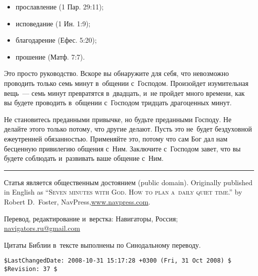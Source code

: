 \documentclass[12pt,article,a4paper,fittopage]{ncc}
\begin{document}
\begin{multicols}{2}
\begin{itemize}
\item прославление (1 Пар. 29:11);
\item исповедание (1 Ин. 1:9); 
\item благодарение (Ефес. 5:20);
\item прошение (Матф. 7:7).
\end{itemize}

Это просто руководство. Вскоре вы обнаружите для себя, что невозможно проводить только семь минут в~общении с~Господом. Произойдет изумительная вещь~--- семь минут превратятся в~двадцать, и~не пройдет много времени, как вы будете проводить в~общении с~Господом тридцать драгоценных минут.

Не становитесь преданными привычке, но будьте преданными Господу. Не делайте этого только потому, что другие делают. Пусть это не~будет бездуховной ежеутренней обязанностью. Применяйте это, потому что сам Бог дал нам бесценную привилегию общения с~Ним. Заключите с~Господом завет, что вы будете соблюдать и~развивать ваше общение с~Ним. 

\end{multicols}

\hrule
\vspace{0.3cm}
\begin{footnotesize}
\noindent
Статья является общественным достоянием (public domain). Originally published in English as  \textsc{``Seven minutes with God. How to plan a~daily quiet time.''} by Robert D.~Foster, NavPress,\linebreak \url{www.navpress.com}.

\vspace{0.2cm}
\noindent
Перевод, редактирование и~верстка: Навигаторы, Россия; \url{navigators.ru@gmail.com}

\vspace{0.2cm}
\noindent
Цитаты Библии в~тексте выполнены по Синодальному переводу.

\end{footnotesize}

{\tiny 
\begin{verbatim}
$LastChangedDate: 2008-10-31 15:17:28 +0300 (Fri, 31 Oct 2008) $
$Revision: 37 $
\end{verbatim}

}
\end{document}
